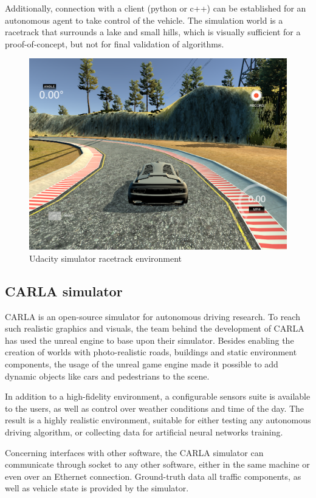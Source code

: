 Additionally, connection with a client (python or c++) can be established for an autonomous agent to take control of the vehicle. The simulation world is a racetrack that surrounds a lake and small hills, which is visually sufficient for a proof-of-concept, but not for final validation of algorithms.
\begin{figure}[ht]
\includegraphics[width=\linewidth]{Figures/udacity_sim.png}
\centering
\caption{Udacity simulator racetrack environment}
\end{figure}
\pagebreak
\subsection{CARLA simulator}
CARLA is an open-source simulator for autonomous driving research. To reach such realistic graphics and visuals, the team behind the development of CARLA has used the unreal engine to base upon their simulator. Besides enabling the creation of worlds with photo-realistic roads, buildings and static environment components, the usage of the unreal game engine made it possible to add dynamic objects like cars and pedestrians to the scene.

In addition to a high-fidelity environment, a configurable sensors suite is available to the users, as well as control over weather conditions and time of the day. The result is a highly realistic environment, suitable for either testing any autonomous driving algorithm, or collecting data for artificial neural networks training.

Concerning interfaces with other software, the CARLA simulator can communicate through socket to any other software, either in the same machine or even over an Ethernet connection. Ground-truth data all traffic components, as well as vehicle state is provided by the simulator.

